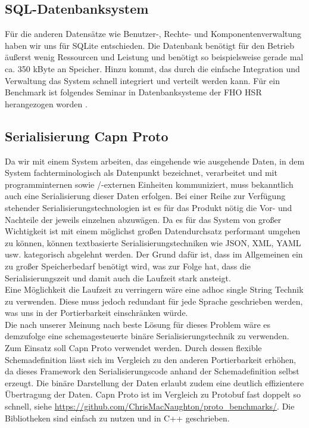 \subsection{SQL-Datenbanksystem}
Für die anderen Datensätze wie Benutzer-, Rechte- und Komponentenverwaltung haben wir uns für SQLite entschieden. Die Datenbank benötigt für den Betrieb äußerst wenig Ressourcen und Leistung und benötigt so beispielsweise gerade mal ca. 350 kByte an Speicher. Hinzu kommt, das durch die einfache Integration und Verwaltung das System schnell integriert und verteilt werden kann. Für ein Benchmark ist folgendes Seminar in Datenbanksysteme der FHO HSR herangezogen worden \cite{MorierWeber2011}.
\subsection{Serialisierung Capn Proto}
Da wir mit einem System arbeiten, das eingehende wie ausgehende Daten, in dem System fachterminologisch als Datenpunkt bezeichnet, verarbeitet und mit programminternen sowie /-externen Einheiten kommuniziert, muss bekanntlich auch eine Serialisierung dieser Daten erfolgen.  Bei einer Reihe zur Verfügung stehender Serialisierungstechnologien ist es für das Produkt nötig die Vor- und Nachteile der jeweils einzelnen abzuwägen. Da es für das System von großer Wichtigkeit ist mit einem möglichst großen Datendurchsatz performant umgehen zu können, können textbasierte Serialisierungstechniken wie JSON, XML, YAML usw. kategorisch abgelehnt werden. Der Grund dafür ist, dass im Allgemeinen ein zu großer Speicherbedarf benötigt wird, was zur Folge hat, dass die Serialisierungszeit und damit auch die Laufzeit stark ansteigt.\\ 
Eine Möglichkeit die Laufzeit zu verringern wäre eine adhoc single String Technik zu verwenden. Diese muss jedoch redundant für jede Sprache geschrieben werden, was uns in der Portierbarkeit einschränken würde.\\
Die nach unserer Meinung nach beste Lösung für dieses Problem wäre es demzufolge eine schemagesteuerte binäre Serialisierungstechnik zu verwenden. Zum Einsatz soll Capn Proto verwendet werden. Durch dessen flexible Schemadefinition lässt sich im Vergleich zu den anderen Portierbarkeit erhöhen, da dieses Framework den Serialisierungscode anhand der Schemadefinition selbst erzeugt. Die binäre Darstellung der Daten erlaubt zudem eine deutlich effizientere Übertragung der Daten. Capn Proto ist im Vergleich zu Protobuf fast doppelt so schnell, siehe \url{https://github.com/ChrisMacNaughton/proto_benchmarks/}. Die Bibliotheken sind einfach zu nutzen und in C++ geschrieben.

